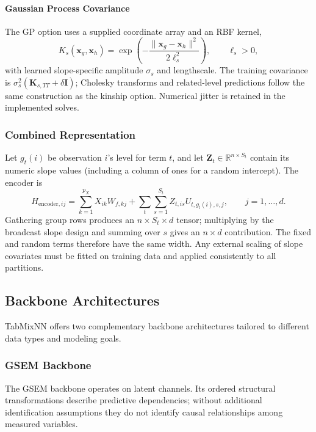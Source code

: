 \documentclass[12pt,a4paper]{article}
\newcommand{\R}{\mathbb{R}}
\begin{document}
\paragraph{Gaussian Process Covariance}
The GP option uses a supplied coordinate array and an RBF kernel,
\begin{equation}
 K_s(\mathbf x_g,\mathbf x_h)
 =\exp\left(-\frac{\|\mathbf x_g-\mathbf x_h\|^2}{2\ell_s^2}\right),
 \qquad \ell_s>0,
\end{equation}
with learned slope-specific amplitude $\sigma_s$ and lengthscale. The training covariance is $\sigma_s^2(\mathbf K_{s,TT}+\delta\mathbf I)$; Cholesky transforms and related-level predictions follow the same construction as the kinship option. Numerical jitter is retained in the implemented solves.

\subsubsection{Combined Representation}

Let $g_t(i)$ be observation $i$'s level for term $t$, and let
$\mathbf Z_t\in\R^{n\times S_t}$ contain its numeric slope values (including a column of ones for a random intercept). The encoder is
\begin{equation}
 H_{\mathrm{encoder},ij}
 =\sum_{k=1}^{p_X}X_{ik}W_{f,kj}
   +\sum_t\sum_{s=1}^{S_t}Z_{t,is}U_{t,g_t(i),s,j},
 \qquad j=1,\ldots,d.
\end{equation}
Gathering group rows produces an $n\times S_t\times d$ tensor; multiplying by the broadcast slope design and summing over $s$ gives an $n\times d$ contribution. The fixed and random terms therefore have the same width. Any external scaling of slope covariates must be fitted on training data and applied consistently to all partitions.

\subsection{Backbone Architectures}
\label{sec:backbones}

TabMixNN offers two complementary backbone architectures tailored to different data types and modeling goals.

\subsubsection{GSEM Backbone}
\label{sec:gsem}

The GSEM backbone operates on latent channels. Its ordered structural transformations describe predictive dependencies; without additional identification assumptions they do not identify causal relationships among measured variables.
\end{document}
